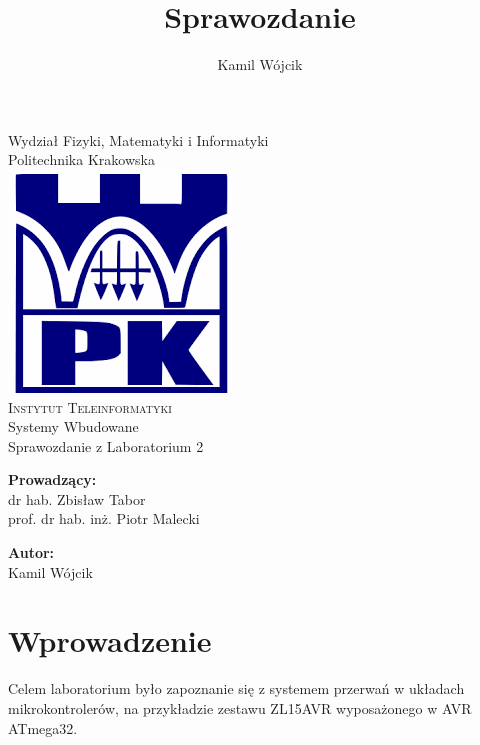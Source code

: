 \documentclass[12pt]{article}
\author{Kamil Wójcik}
\title{Sprawozdanie}
\begin{document}
\begin{titlepage}
 
\begin{center}

{\Large {Wydział Fizyki, Matematyki i Informatyki\\Politechnika Krakowska
} }
\\[1cm] 
\includegraphics[scale=0.4]{pk.png}
\\[1cm]

{\Huge \textsc{Instytut Teleinformatyki}}\\[0.7cm]
{\Huge Systemy Wbudowane}\\[2cm]
{\Large Sprawozdanie z Laboratorium 2}\\[2cm]

\begin{minipage}[l]{0.4\textwidth}
    \begin{flushleft}
        \textbf{\textsf{Prowadzący:}}\\
        \large dr hab. Zbisław Tabor\\
        \large prof. dr hab. inż. Piotr Malecki\\ 
        \end{flushleft}
\end{minipage}
\begin{minipage}[l]{0.4\textwidth}
    \begin{flushright}
        \textbf{\textsf{Autor:}}\\
        \linespread{1}
        \large Kamil Wójcik
    \end{flushright}
\end{minipage}
 
\end{center}
 
\end{titlepage}



\section{Wprowadzenie}
Celem laboratorium było zapoznanie się z systemem przerwań w układach mikrokontrolerów, na przykładzie zestawu ZL15AVR wyposażonego w AVR ATmega32.
\end{document}
